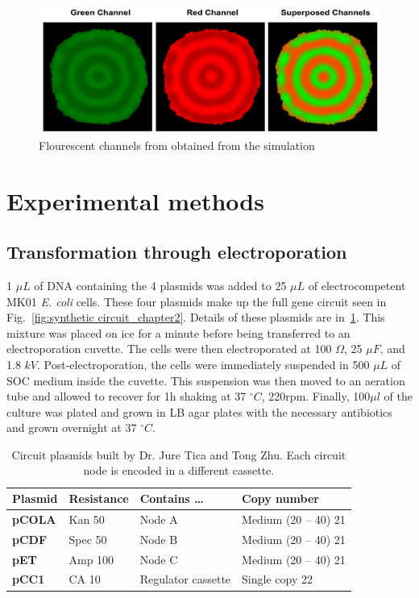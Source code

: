 \begin{figure}[H]

    \includegraphics[width=1\textwidth]{chapters/Methods/redgreesupersposed}
    \caption{Flourescent channels from obtained from the simulation}
    \label{redgreesupersposed}
\end{figure}




\section{Experimental methods}
\subsection{Transformation through electroporation}\label{electroporation}
1 $\mu L$ of DNA containing the 4 plasmids was added to 25 $\mu L$ of electrocompetent MK01 \textit{E. coli} cells.
These four plasmids make up the full gene circuit seen in Fig.~\ref{fig:synthetic circuit_chapter2}.
Details of these plasmids are in~\ref{tab:plasmid table}.
This mixture was placed on ice for a minute before being transferred to an electroporation cuvette.
The cells were then electroporated at 100 $\Omega$, 25 $\mu F$, and 1.8 $kV$.
Post-electroporation, the cells were immediately suspended in 500 $\mu L$ of SOC medium inside the cuvette.
This suspension was then moved to an aeration tube and allowed to recover for 1h shaking at 37 $^{\circ} C$, 220rpm.
Finally, 100$\mu l$ of the culture was plated and grown in LB agar plates with the necessary antibiotics and grown overnight at 37 $^{\circ} C$.

\begin{table}[H]
    \centering
    \begin{tabular}{llll}
        \toprule
        \textbf{Plasmid} & \textbf{Resistance} & \textbf{Contains …} & \textbf{Copy number} \\
        \midrule
        \textbf{pCOLA} & Kan 50 & Node A & Medium (20 – 40) 21 \\
        \textbf{pCDF} & Spec 50 & Node B & Medium (20 – 40) 21 \\
        \textbf{pET} & Amp 100 & Node C & Medium (20 – 40) 21 \\
        \textbf{pCC1} & CA 10 & Regulator cassette & Single copy 22 \\
        \bottomrule
    \end{tabular}
    \caption{Circuit plasmids built by Dr. Jure Tica and Tong Zhu. Each circuit node is encoded in a different cassette.}
    \label{tab:plasmid table}
\end{table}


